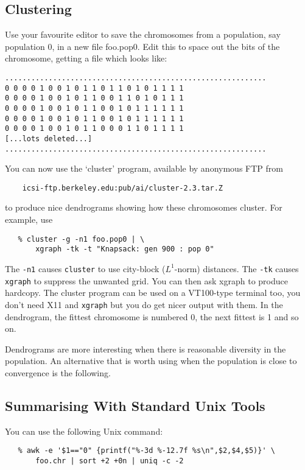 \subsection*{Clustering}

Use your favourite editor to save the chromosomes from a population, say
population 0, in a new file foo.pop0. Edit this to space out the
bits of the chromosome, getting a file which looks like:
\begin{verbatim}
............................................................
0 0 0 0 1 0 0 1 0 1 1 0 1 1 0 1 0 1 1 1 1   
0 0 0 0 1 0 0 1 0 1 1 0 0 1 1 0 1 0 1 1 1   
0 0 0 0 1 0 0 1 0 1 1 0 0 1 0 1 1 1 1 1 1   
0 0 0 0 1 0 0 1 0 1 1 0 0 1 0 1 1 1 1 1 1   
0 0 0 0 1 0 0 1 0 1 1 0 0 0 1 1 0 1 1 1 1   
[...lots deleted...]
............................................................
\end{verbatim}
You can now use the `cluster' program, available by anonymous FTP from
\begin{verbatim}
    icsi-ftp.berkeley.edu:pub/ai/cluster-2.3.tar.Z
\end{verbatim}
to produce nice dendrograms showing how these chromosomes cluster.
For example, use
\begin{verbatim}
   % cluster -g -n1 foo.pop0 | \
       xgraph -tk -t "Knapsack: gen 900 : pop 0"
\end{verbatim}
The \verb|-n1| causes \verb|cluster| to use city-block ($L^1$-norm)
distances.  The \verb|-tk| causes \verb|xgraph| to suppress the
unwanted grid. You can then ask xgraph to produce hardcopy. The
cluster program can be used on a VT100-type terminal too, you don't
need X11 and \verb|xgraph| but you do get nicer output with them. In the
dendrogram, the fittest chromosome is numbered 0, the next fittest is
1 and so on.

Dendrograms are more interesting when there is reasonable diversity
in the population. An alternative that is worth using when the
population is close to convergence is the following.

\subsection*{Summarising With Standard Unix Tools}

You can use the following Unix command:
\begin{verbatim}
   % awk -e '$1=="0" {printf("%-3d %-12.7f %s\n",$2,$4,$5)}' \
       foo.chr | sort +2 +0n | uniq -c -2
\end{verbatim}

